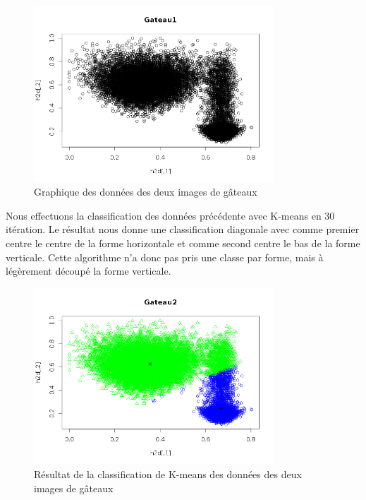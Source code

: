 \documentclass[a4paper,11pt]{article}
\begin{document}
  \begin{figure}[H]
    \center
    \includegraphics[width=9cm]{resultat/image_combine.png}
    \caption{Graphique des données des deux images de gâteaux}
  \end{figure}
  
  Nous effectuons la classification des données précédente avec K-means en 30 itération. Le résultat
  nous donne une classification diagonale avec comme premier centre le centre de la forme horizontale et 
  comme second centre le bas de la forme verticale. Cette algorithme n'a donc pas pris une classe par forme,
  mais à légèrement découpé la forme verticale.
  
  \begin{figure}[H]
    \center
    \includegraphics[width=9cm]{resultat/classification_gateau.png}
    \caption{Résultat de la classification de K-means des données des deux images de gâteaux}
  \end{figure}
  
  
\end{document}
